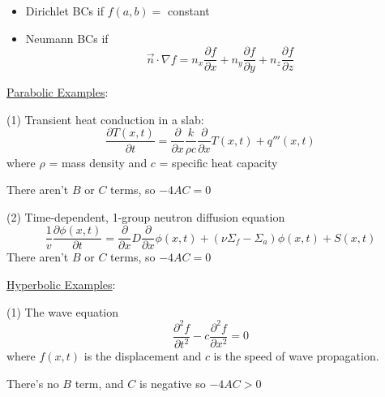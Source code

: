 \documentclass[12pt]{article}
\newcommand{\Macro}{\ensuremath{\Sigma}}
\begin{document}
\begin{itemize}
\item Dirichlet BCs if $f(a,b) =$ constant
\item Neumann BCs if 
\begin{equation}
\vec{n} \cdot \nabla f = n_x \frac{\partial f} {\partial x} + n_y \frac{\partial f} {\partial y}  +n_z \frac{\partial f} {\partial z} \nonumber
\end{equation}
\end{itemize}

\vspace*{1em}
\noindent \underline{Parabolic Examples}:

(1) Transient heat conduction in a slab:
%
\begin{equation}
\frac{\partial T(x,t)}{\partial t} = \frac{\partial}{\partial x} \frac{k}{\rho c} \frac{\partial}{\partial x} T(x,t) + q'''(x,t) \nonumber
\end{equation}
%
where $\rho$ = mass density and $c$ = specific heat capacity

\noindent There aren't $B$ or $C$ terms, so $-4AC = 0$


\vspace*{2em}
(2) Time-dependent, 1-group neutron diffusion equation
%
\begin{equation}
\frac{1}{v} \frac{\partial \phi(x,t)}{\partial t} = \frac{\partial}{\partial x} D \frac{\partial}{\partial x} \phi(x,t) + (\nu \Macro_f - \Macro_a) \phi(x,t) + S(x,t) \nonumber
\end{equation}
%
There aren't $B$ or $C$ terms, so $-4AC = 0$

\vspace*{1em}
\noindent \underline{Hyperbolic Examples}:

(1) The wave equation
%
\begin{equation}
\frac{\partial^2 f}{\partial t^2} - c \frac{\partial^2 f}{\partial x^2} = 0
\end{equation}
%
where $f(x,t)$ is the displacement and $c$ is the speed of wave propagation.

\noindent There's no $B$ term, and $C$ is negative so $-4AC > 0$
\end{document}

